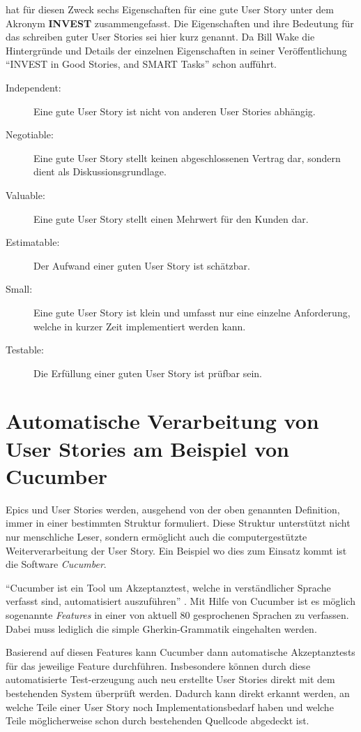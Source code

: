 \documentclass[acmtog]{acmart}
\begin{document}
\cite{wake_invest_2003} hat für diesen Zweck sechs Eigenschaften für eine gute User Story unter dem Akronym \textbf{INVEST} zusammengefasst.
Die Eigenschaften und ihre Bedeutung für das schreiben guter User Stories sei hier kurz genannt.
Da Bill Wake die Hintergründe und Details der einzelnen Eigenschaften in seiner Veröffentlichung ``INVEST in Good Stories, and SMART Tasks'' schon aufführt.
\begin{description}
	\item[Independent:] Eine gute User Story ist nicht von anderen User Stories abhängig.
	\item[Negotiable:] Eine gute User Story stellt keinen abgeschlossenen Vertrag dar, sondern dient als Diskussionsgrundlage.
	\item[Valuable:] Eine gute User Story stellt einen Mehrwert für den Kunden dar.
	\item[Estimatable:] Der Aufwand einer guten User Story ist schätzbar.
	\item[Small:] Eine gute User Story ist klein und umfasst nur eine einzelne Anforderung, welche in kurzer Zeit implementiert werden kann.
	\item[Testable:] Die Erfüllung einer guten User Story ist prüfbar sein.
\end{description}

\section{Automatische Verarbeitung von User Stories am Beispiel von Cucumber}
Epics und User Stories werden, ausgehend von der oben genannten Definition, immer in einer bestimmten Struktur formuliert.
Diese Struktur unterstützt nicht nur menschliche Leser, sondern ermöglicht auch die computergestützte Weiterverarbeitung der User Story.
Ein Beispiel wo dies zum Einsatz kommt ist die Software \emph{Cucumber}.

``Cucumber ist ein Tool um Akzeptanztest, welche in verständlicher Sprache verfasst sind, automatisiert auszuführen'' \cite{the_cucumber_open_source_project_cucumber_2025}.
Mit Hilfe von Cucumber ist es möglich sogenannte \emph{Features} in einer von aktuell 80 gesprochenen Sprachen zu verfassen.
Dabei muss lediglich die simple Gherkin-Grammatik eingehalten werden.

Basierend auf diesen Features kann Cucumber dann automatische Akzeptanztests für das jeweilige Feature durchführen.
Insbesondere können durch diese automatisierte Test-erzeugung auch neu erstellte User Stories direkt mit dem bestehenden System
überprüft werden. Dadurch kann direkt erkannt werden, an welche Teile einer User Story noch Implementationsbedarf haben und welche
Teile möglicherweise schon durch bestehenden Quellcode abgedeckt ist.
\end{document}
